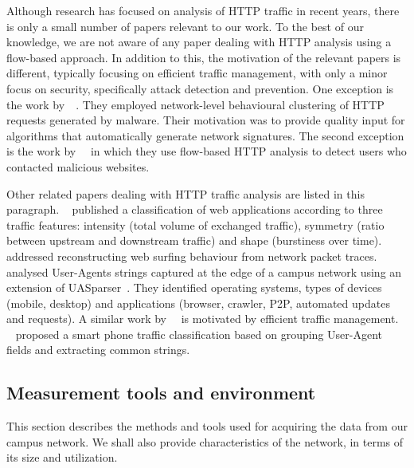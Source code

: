 Although research has focused on analysis of HTTP traffic in recent years, there is only a small number of papers relevant to our work. To the best of our knowledge, we are not aware of any paper dealing with HTTP analysis using a flow-based approach. In addition to this, the motivation of the relevant papers is different, typically focusing on efficient traffic management, with only a minor focus on security, specifically attack detection and prevention. One exception is the work by~\citeauthor{Perdisci-2010-Behavioral}~\cite{Perdisci-2010-Behavioral}. They employed network-level behavioural clustering of HTTP requests generated by malware. Their motivation was to provide quality input for algorithms that automatically generate network signatures. The second exception is the work by~\citeauthor{Husak-2014-PhiGARo}~\cite{Husak-2014-PhiGARo} in which they use flow-based HTTP analysis to detect users who contacted malicious websites.

Other related papers dealing with HTTP traffic analysis are listed in this paragraph. \citeauthor{Augustin-2011-Traffic}~\cite{Augustin-2011-Traffic} published a classification of web applications according to three traffic features: intensity (total volume of exchanged traffic), symmetry (ratio between upstream and downstream traffic) and shape (burstiness over time). \citeauthor{Xie-2013-ReSurf}~\cite{Xie-2013-ReSurf} addressed reconstructing web surfing behaviour from network packet traces. \citeauthor{Xu-2014-Toward}~\cite{Xu-2014-Toward} analysed User-Agents strings captured at the edge of a campus network using an extension of UASparser~\cite{Mallat-2017-UASparser}. They identified operating systems, types of devices (mobile, desktop) and applications (browser, crawler, P2P, automated updates and requests). A similar work by~\citeauthor{Jin-2012-Integrated}~\cite{Jin-2012-Integrated} is motivated by efficient traffic management. \citeauthor{Hur-2012-Towards}~\cite{Hur-2012-Towards} proposed a smart phone traffic classification based on grouping User-Agent fields and extracting common strings.

\subsection{Measurement tools and environment}\label{subsec:httpsecurity-measurement}

This section describes the methods and tools used for acquiring the data from our campus network. We shall also provide characteristics of the network, in terms of its size and utilization.

